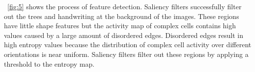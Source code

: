 \documentclass[twocolumn]{article}
\begin{document}
\figurename~\ref{fig:5} shows the process of feature detection.
Saliency filters successfully filter out the trees and handwriting at the background of the images.
These regions have little shape features but the activity map of complex cells contains high values caused by a large amount of disordered edges. 
Disordered edges result in high entropy values because the distribution of complex cell activity over different orientations is near uniform.
Saliency filters filter out these regions by applying a threshold to the entropy map.

\begin{figure}[!t]
\centering
{}\hfil
{}\hfil
{}\\
\hfil
{}\hfil

\end{figure}
\end{document}
